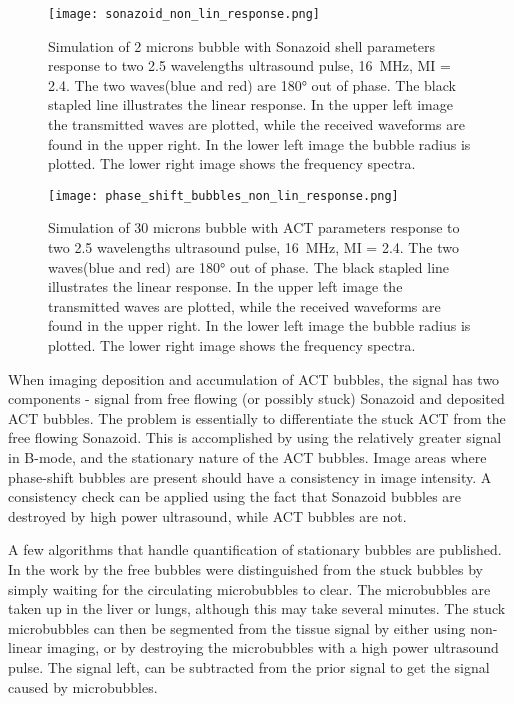 \begin{figure}
	\texttt{[image: sonazoid\_non\_lin\_response.png]}
	\caption{Simulation of 2 microns bubble with Sonazoid\texttrademark{} shell parameters response to two \num{2.5} wavelengths ultrasound pulse,  \SI{16}{\mega\hertz}, MI = \num{2.4}. The two waves(blue and red) are \ang{180} out of phase. The black stapled line illustrates the linear response. In the upper left image the transmitted waves are plotted, while the received waveforms are found in the upper right. In the lower left image the bubble radius is plotted. The lower right image shows the frequency spectra.} 
	\label{Fig:sonazoid_non_lin_response}
\end{figure}
\begin{figure}
	\texttt{[image: phase\_shift\_bubbles\_non\_lin\_response.png]}
	\caption{Simulation of 30 microns bubble with ACT\texttrademark{} parameters response to two \num{2.5} wavelengths ultrasound pulse,  \SI{16}{\mega\hertz}, MI = \num{2.4}. The two waves(blue and red) are \ang{180} out of phase. The black stapled line illustrates the linear response. In the upper left image the transmitted waves are plotted, while the received waveforms are found in the upper right. In the lower left image the bubble radius is plotted. The lower right image shows the frequency spectra.} 
	\label{Fig:PS_non_lin_response}
\end{figure}

When imaging deposition and accumulation of ACT\texttrademark{} bubbles, the signal has two components - signal from free flowing (or possibly stuck) Sonazoid\texttrademark{} and deposited ACT\texttrademark{} bubbles. The problem is essentially to differentiate the stuck ACT\texttrademark{} from the free flowing Sonazoid\texttrademark{}. This is accomplished by using the relatively greater signal in B-mode, and the stationary nature of the ACT\texttrademark{} bubbles. Image areas where phase-shift bubbles are present should have a consistency in image intensity. A consistency check can be applied using the fact that Sonazoid\texttrademark{} bubbles are destroyed by high power ultrasound, while ACT\texttrademark{} bubbles are not. 

A few algorithms that handle quantification of stationary bubbles are published. In the work by \citet{Rychak2006} the free bubbles were distinguished from the stuck bubbles by simply waiting for the circulating microbubbles to clear. The microbubbles are taken up in the liver or lungs, although this may take several minutes. The stuck microbubbles can then be segmented from the tissue signal by either using non-linear imaging, or by destroying the microbubbles with a high power ultrasound pulse. The signal left, can be subtracted from the prior signal to get the signal caused by microbubbles.

